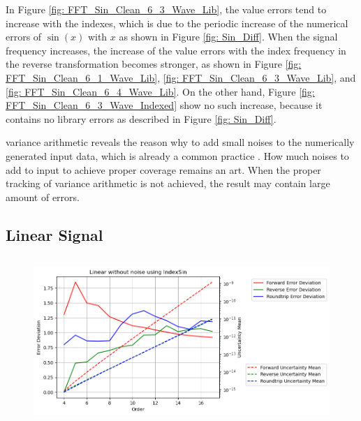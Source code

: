 \documentclass[twoside]{article}
\numberwithin{equation}{section}
\begin{document}
In Figure \ref{fig: FFT_Sin_Clean_6_3_Wave_Lib}, the value errors tend to increase with the indexes, which is due to the periodic increase of the numerical errors of $\sin(x)$ with $x$ as shown in Figure \ref{fig: Sin_Diff}.
When the signal frequency increases, the increase of the value errors with the index frequency in the reverse transformation becomes stronger, as shown in Figure \ref{fig: FFT_Sin_Clean_6_1_Wave_Lib}, \ref{fig: FFT_Sin_Clean_6_3_Wave_Lib}, and \ref{fig: FFT_Sin_Clean_6_4_Wave_Lib}.
On the other hand, Figure \ref{fig: FFT_Sin_Clean_6_3_Wave_Indexed} show no such increase, because it contains no library errors as described in Figure \ref{fig: Sin_Diff}.

variance arithmetic reveals the reason why to add small noises to the numerically generated input data, which is already a common practice \cite{Numerical_Recipes}.
How much noises to add to input to achieve proper coverage remains an art.
When the proper tracking of variance arithmetic is not achieved, the result may contain large amount of errors.


\subsection{Linear Signal}

\begin{figure}[p]
\centering
\includegraphics[height=2.5in]{FFT_Linear_Clean_vs_Order_Indexed.png} 
\label{fig: FFT_SinCos_Linear_vs_Order_Indexed}
\end{figure}
\end{document}

